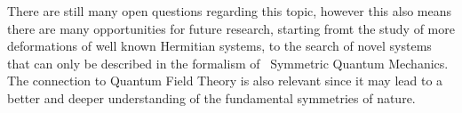     There are still many open questions regarding this topic, however this also means there are many opportunities for future research, starting fromt the study of more deformations of well known Hermitian systems, to the search of novel systems that can only be described in the formalism of \PT\ Symmetric Quantum Mechanics. The connection to Quantum Field Theory is also relevant since it may lead to a better and deeper understanding of the fundamental symmetries of nature.